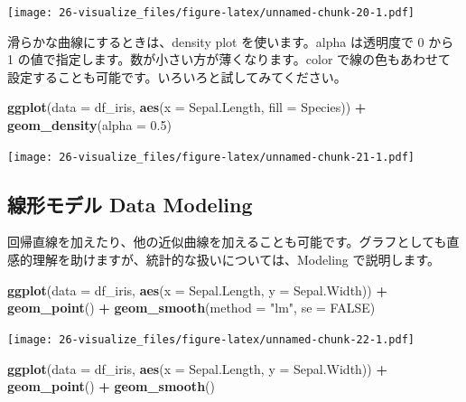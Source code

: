 \documentclass[
  xelatex, ja=standard]{bxjsbook}
\newenvironment{Shaded}{\begin{snugshade}}{\end{snugshade}}
\newcommand{\AttributeTok}[1]{\textcolor[rgb]{0.13,0.29,0.53}{#1}}
\newcommand{\ConstantTok}[1]{\textcolor[rgb]{0.56,0.35,0.01}{#1}}
\newcommand{\FloatTok}[1]{\textcolor[rgb]{0.00,0.00,0.81}{#1}}
\newcommand{\FunctionTok}[1]{\textcolor[rgb]{0.13,0.29,0.53}{\textbf{#1}}}
\newcommand{\NormalTok}[1]{#1}
\newcommand{\SpecialCharTok}[1]{\textcolor[rgb]{0.81,0.36,0.00}{\textbf{#1}}}
\newcommand{\StringTok}[1]{\textcolor[rgb]{0.31,0.60,0.02}{#1}}
\theoremstyle{definition}
\theoremstyle{definition}
\theoremstyle{definition}
\theoremstyle{definition}
\theoremstyle{remark}
\begin{document}
\texttt{[image: 26-visualize\_files/figure-latex/unnamed-chunk-20-1.pdf]}

滑らかな曲線にするときは、density plot を使います。alpha は透明度で 0 から 1 の値で指定します。数が小さい方が薄くなります。color で線の色もあわせて設定することも可能です。いろいろと試してみてください。

\begin{Shaded}
\begin{Highlighting}[]
\FunctionTok{ggplot}\NormalTok{(}\AttributeTok{data =}\NormalTok{ df\_iris, }\FunctionTok{aes}\NormalTok{(}\AttributeTok{x =}\NormalTok{ Sepal.Length, }\AttributeTok{fill =}\NormalTok{ Species)) }\SpecialCharTok{+}
  \FunctionTok{geom\_density}\NormalTok{(}\AttributeTok{alpha =} \FloatTok{0.5}\NormalTok{)}
\end{Highlighting}
\end{Shaded}

\texttt{[image: 26-visualize\_files/figure-latex/unnamed-chunk-21-1.pdf]}

\hypertarget{ux7ddaux5f62ux30e2ux30c7ux30eb-data-modeling}{%
\subsection{線形モデル Data Modeling}\label{ux7ddaux5f62ux30e2ux30c7ux30eb-data-modeling}}

回帰直線を加えたり、他の近似曲線を加えることも可能です。グラフとしても直感的理解を助けますが、統計的な扱いについては、Modeling で説明します。

\begin{Shaded}
\begin{Highlighting}[]
\FunctionTok{ggplot}\NormalTok{(}\AttributeTok{data =}\NormalTok{ df\_iris, }\FunctionTok{aes}\NormalTok{(}\AttributeTok{x =}\NormalTok{ Sepal.Length, }\AttributeTok{y =}\NormalTok{ Sepal.Width)) }\SpecialCharTok{+}
  \FunctionTok{geom\_point}\NormalTok{() }\SpecialCharTok{+}
  \FunctionTok{geom\_smooth}\NormalTok{(}\AttributeTok{method =} \StringTok{"lm"}\NormalTok{, }\AttributeTok{se =} \ConstantTok{FALSE}\NormalTok{)}
\end{Highlighting}
\end{Shaded}

\texttt{[image: 26-visualize\_files/figure-latex/unnamed-chunk-22-1.pdf]}

\begin{Shaded}
\begin{Highlighting}[]
\FunctionTok{ggplot}\NormalTok{(}\AttributeTok{data =}\NormalTok{ df\_iris, }\FunctionTok{aes}\NormalTok{(}\AttributeTok{x =}\NormalTok{ Sepal.Length, }\AttributeTok{y =}\NormalTok{ Sepal.Width)) }\SpecialCharTok{+}
  \FunctionTok{geom\_point}\NormalTok{() }\SpecialCharTok{+}
  \FunctionTok{geom\_smooth}\NormalTok{()}
\end{Highlighting}
\end{Shaded}
\end{document}
